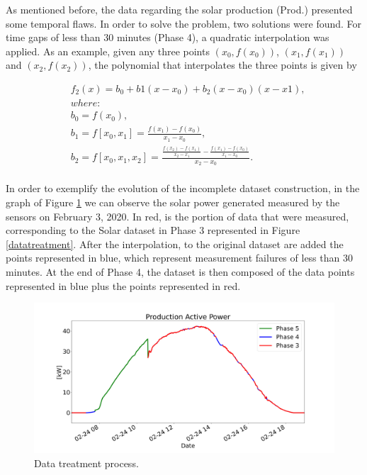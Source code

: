 As mentioned before, the data regarding the solar production (Prod.) presented some temporal flaws. In order to solve the problem, two solutions were found. For time gaps of less than 30 minutes (Phase 4), a quadratic interpolation was applied. As an example, given any three points $(x_0, f(x_0))$, $(x_1, f(x_1))$ and $(x_2, f(x_2))$, the polynomial that interpolates the three points is given by

\begin{equation}
\begin{split}
     & f_2(x)=b_0+b1(x-x_0)+b_2(x-x_0)(x-x1),\\
     & where:\\
     & b_0=f(x_0),\\
     & b_1=f[x_0,x_1]=\frac{f(x_1)-f(x_0)}{x_1-x_0},\\
     & b_2=f[x_0,x_1,x_2]=\frac{\frac{f(x_2)-f(x_1)}{x_2-x_1}-\frac{f(x_1)-f(x_0)}{x_1-x_0}}{x_2-x_0}.\\
\end{split}
\label{poly}
\end{equation}

In order to exemplify the evolution of the incomplete dataset construction, in the graph of Figure \ref{int0} we can observe the solar power generated measured by the sensors on February 3, 2020. In red, is the portion of data that were measured, corresponding to the Solar dataset in Phase 3 represented in Figure \ref{datatreatment}. After the interpolation, to the original dataset are added the points represented in blue, which represent measurement failures of less than 30 minutes. At the end of Phase 4, the dataset is then composed of the data points represented in blue plus the points represented in red.



\begin{figure}[h!]
    \centering
    \begin{center}
    \includegraphics[width=1\textwidth]{Images/int0.png}
    \caption{Data treatment process.}
    \label{int0}
    \end{center}
\end{figure}





